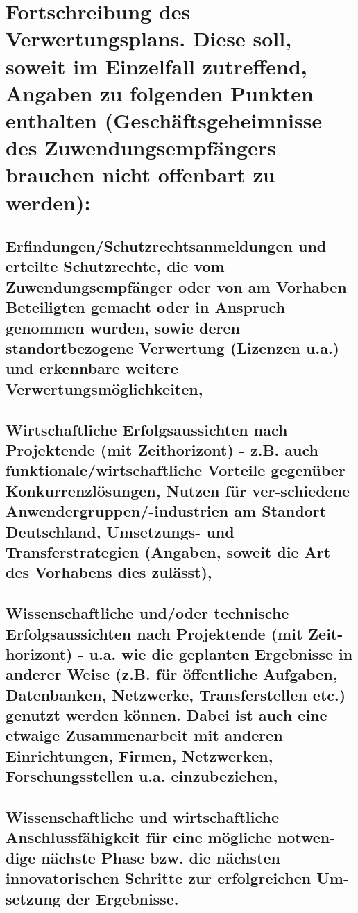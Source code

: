 \section{Fortschreibung des Verwertungsplans. Diese soll, soweit im Einzelfall zutreffend, Angaben zu folgenden Punkten enthalten (Geschäftsgeheimnisse des Zuwendungsempfängers brauchen nicht offenbart zu werden):}

\subsection{Erfindungen/Schutzrechtsanmeldungen und erteilte Schutzrechte, die vom Zuwendungsempfänger oder von am Vorhaben Beteiligten gemacht oder in Anspruch genommen wurden, sowie deren standortbezogene Verwertung (Lizenzen u.a.) und erkennbare weitere Verwertungsmöglichkeiten,}

\subsection{Wirtschaftliche Erfolgsaussichten nach Projektende (mit Zeithorizont) - z.B. auch funktionale/wirtschaftliche Vorteile gegenüber Konkurrenzlösungen, Nutzen für ver-schiedene Anwendergruppen/-industrien am Standort Deutschland, Umsetzungs- und Transferstrategien (Angaben, soweit die Art des Vorhabens dies zulässt),}

\subsection{Wissenschaftliche und/oder technische Erfolgsaussichten nach Projektende (mit Zeit-horizont) - u.a. wie die geplanten Ergebnisse in anderer Weise (z.B. für öffentliche Aufgaben, Datenbanken, Netzwerke, Transferstellen etc.) genutzt werden können. Dabei ist auch eine etwaige Zusammenarbeit mit anderen Einrichtungen, Firmen, Netzwerken, Forschungsstellen u.a. einzubeziehen,}

\subsection{Wissenschaftliche und wirtschaftliche Anschlussfähigkeit für eine mögliche notwen-dige nächste Phase bzw. die nächsten innovatorischen Schritte zur erfolgreichen Um-setzung der Ergebnisse.}

